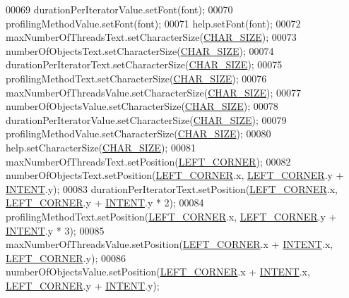 \begin{DoxyCode}
00069     durationPerIteratorValue.setFont(font);
00070     profilingMethodValue.setFont(font);
00071     help.setFont(font);
00072     maxNumberOfThreadsText.setCharacterSize(\hyperlink{main_8cpp_ad48cdf9a3927c8fa8f6017c70d046ba0}{CHAR\_SIZE});
00073     numberOfObjectsText.setCharacterSize(\hyperlink{main_8cpp_ad48cdf9a3927c8fa8f6017c70d046ba0}{CHAR\_SIZE});
00074     durationPerIteratorText.setCharacterSize(\hyperlink{main_8cpp_ad48cdf9a3927c8fa8f6017c70d046ba0}{CHAR\_SIZE});
00075     profilingMethodText.setCharacterSize(\hyperlink{main_8cpp_ad48cdf9a3927c8fa8f6017c70d046ba0}{CHAR\_SIZE});
00076     maxNumberOfThreadsValue.setCharacterSize(\hyperlink{main_8cpp_ad48cdf9a3927c8fa8f6017c70d046ba0}{CHAR\_SIZE});
00077     numberOfObjectsValue.setCharacterSize(\hyperlink{main_8cpp_ad48cdf9a3927c8fa8f6017c70d046ba0}{CHAR\_SIZE});
00078     durationPerIteratorValue.setCharacterSize(\hyperlink{main_8cpp_ad48cdf9a3927c8fa8f6017c70d046ba0}{CHAR\_SIZE});
00079     profilingMethodValue.setCharacterSize(\hyperlink{main_8cpp_ad48cdf9a3927c8fa8f6017c70d046ba0}{CHAR\_SIZE});
00080     help.setCharacterSize(\hyperlink{main_8cpp_ad48cdf9a3927c8fa8f6017c70d046ba0}{CHAR\_SIZE});
00081     maxNumberOfThreadsText.setPosition(\hyperlink{main_8cpp_a532235d92b81b25e98dc2f260296c811}{LEFT\_CORNER});
00082     numberOfObjectsText.setPosition(\hyperlink{main_8cpp_a532235d92b81b25e98dc2f260296c811}{LEFT\_CORNER}.x, \hyperlink{main_8cpp_a532235d92b81b25e98dc2f260296c811}{LEFT\_CORNER}.y + 
      \hyperlink{main_8cpp_a14d85091e46f0926119718516c204b46}{INTENT}.y);
00083     durationPerIteratorText.setPosition(\hyperlink{main_8cpp_a532235d92b81b25e98dc2f260296c811}{LEFT\_CORNER}.x, \hyperlink{main_8cpp_a532235d92b81b25e98dc2f260296c811}{LEFT\_CORNER}.y + 
      \hyperlink{main_8cpp_a14d85091e46f0926119718516c204b46}{INTENT}.y * 2);
00084     profilingMethodText.setPosition(\hyperlink{main_8cpp_a532235d92b81b25e98dc2f260296c811}{LEFT\_CORNER}.x, \hyperlink{main_8cpp_a532235d92b81b25e98dc2f260296c811}{LEFT\_CORNER}.y + 
      \hyperlink{main_8cpp_a14d85091e46f0926119718516c204b46}{INTENT}.y * 3);
00085     maxNumberOfThreadsValue.setPosition(\hyperlink{main_8cpp_a532235d92b81b25e98dc2f260296c811}{LEFT\_CORNER}.x + \hyperlink{main_8cpp_a14d85091e46f0926119718516c204b46}{INTENT}.x, 
      \hyperlink{main_8cpp_a532235d92b81b25e98dc2f260296c811}{LEFT\_CORNER}.y);
00086     numberOfObjectsValue.setPosition(\hyperlink{main_8cpp_a532235d92b81b25e98dc2f260296c811}{LEFT\_CORNER}.x + \hyperlink{main_8cpp_a14d85091e46f0926119718516c204b46}{INTENT}.x, 
      \hyperlink{main_8cpp_a532235d92b81b25e98dc2f260296c811}{LEFT\_CORNER}.y + \hyperlink{main_8cpp_a14d85091e46f0926119718516c204b46}{INTENT}.y);

\end{DoxyCode}
